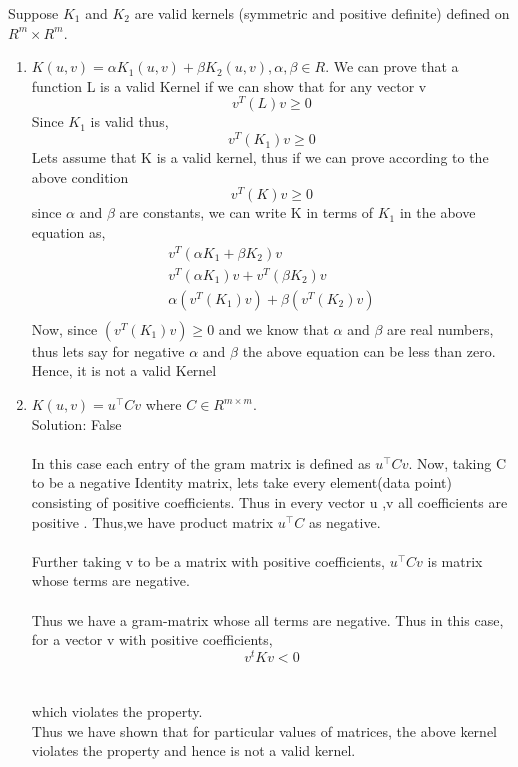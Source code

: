 \documentclass[twoside,11pt]{article}\usepackage{amsmath,amsfonts,amsthm,fullpage}
\begin{document}
 Suppose $K_1$ and $K_2$ are valid kernels (symmetric and positive definite) defined on $R^m\times R^m$.
\begin{enumerate}
\item $K(u,v) = \alpha K_1(u,v) + \beta K_2(u,v), \alpha,\beta\in R$.
We can prove that a function  L is a valid Kernel if we can show that for any vector v
\begin{equation}
v^T(L)v \geq 0
\end{equation}
Since $K_1$ is valid thus,
\begin{equation}
v^T(K_1)v \geq 0
\end{equation}
Lets assume that K is a valid kernel, thus if we can prove according to the above condition \\
\begin{equation}
v^T(K)v \geq 0
\end{equation}
since $\alpha$ and $\beta$  are constants, we can write K in terms of $K_1$ in the above equation as,
\begin{equation}
\begin{split}
v^T(\alpha K_1 +\beta K_2)v \\
v^T(\alpha K_1)v +v^T(\beta K_2)v \\
\alpha( v^T(K_1)v) +\beta (v^T( K_2)v) \\
\end{split}
\end{equation}
Now, since $ ( v^T(K_1)v)  \geq 0$ and we know that $\alpha$ and $\beta$ are real numbers, thus lets say for negative  $\alpha$ and $\beta$  the above equation can be less than zero. Hence, it is not a valid Kernel
\item $K(u,v) = u^\top C v$ where $C\in R^{m\times m}$.
\\Solution: False
\\\\ In this case each entry of the gram matrix is defined as $ u^\top C v $. Now, taking C to be a negative Identity matrix, lets take every element(data point) consisting of positive coefficients. Thus in every vector u ,v all coefficients are positive .  Thus,we have product matrix $u^\top C$ as negative.\\\\Further taking v to be a matrix with positive coefficients, $u^\top C v $ is matrix whose terms are negative. 
\\\\ Thus we have a gram-matrix whose all terms are negative. Thus in this case, for a vector v with positive coefficients, 
\begin{equation}
v^t K v < 0
\end{equation} 
\\\\which violates the property.
\\Thus we have shown that for particular values of matrices, the above kernel violates the property and hence is not  a valid kernel. 


\end{enumerate}
\end{document}
